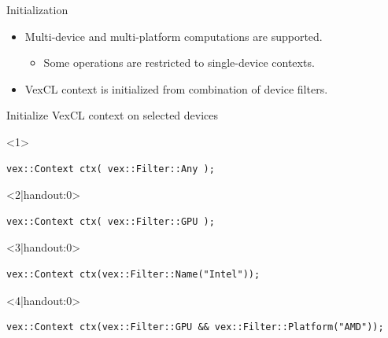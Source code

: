 \documentclass[@BEAMER_OPTIONS@]{beamer}
\begin{document}
\begin{frame}[fragile]{Initialization}
    \begin{itemize}
        \item Multi-device and multi-platform computations are supported.
            \begin{itemize}
                \item Some operations are restricted to single-device
                    contexts.
            \end{itemize}
        \item VexCL context is initialized from combination of device filters.
    \end{itemize}
    \vspace{-0.5\baselineskip}
    \begin{overlayarea}{\textwidth}{0.4\textheight}
    \begin{exampleblock}{Initialize VexCL context on selected devices}
        \begin{onlyenv}<1>
        \begin{lstlisting}
vex::Context ctx( vex::Filter::Any );
        \end{lstlisting}
        \end{onlyenv}
        \begin{onlyenv}<2|handout:0>
        \begin{lstlisting}
vex::Context ctx( vex::Filter::GPU );
        \end{lstlisting}
        \end{onlyenv}
        \begin{onlyenv}<3|handout:0>
        \begin{lstlisting}
vex::Context ctx(vex::Filter::Name("Intel"));
        \end{lstlisting}
        \end{onlyenv}
        \begin{onlyenv}<4|handout:0>
        \begin{lstlisting}
vex::Context ctx(vex::Filter::GPU && vex::Filter::Platform("AMD"));
        \end{lstlisting}
        \end{onlyenv}
    \end{exampleblock}
    \end{overlayarea}
    \begin{figure}
\end{figure}
\end{frame}
\end{document}
